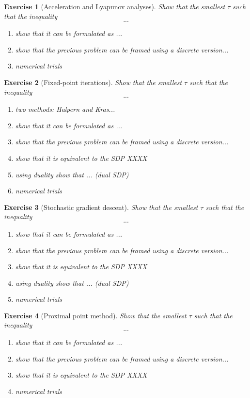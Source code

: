 \documentclass[11pt,a4paper]{article}
\newtheorem{exercise}{Exercise}
\begin{document}
	
	\begin{exercise}[Acceleration and Lyapunov analyses]
	Show that the smallest $\tau$ such that the inequality
	\[ ... \]
	\begin{enumerate}
	\item show that it can be formulated as ...
	\item show that the previous problem can be framed using a discrete version...
	\item numerical trials
	\end{enumerate}
	\end{exercise}
	
	\begin{exercise}[Fixed-point iterations]
	Show that the smallest $\tau$ such that the inequality
	\[ ... \]
	\begin{enumerate}
	\item two methods: Halpern and Kras...
	\item show that it can be formulated as ...
	\item show that the previous problem can be framed using a discrete version...
	\item show that it is equivalent to the SDP XXXX
	\item using duality show that ... (dual SDP)
	\item numerical trials
	\end{enumerate}
	\end{exercise}
	
	
	\begin{exercise}[Stochastic gradient descent]
	Show that the smallest $\tau$ such that the inequality
	\[ ... \]
	\begin{enumerate}
	\item show that it can be formulated as ...
	\item show that the previous problem can be framed using a discrete version...
	\item show that it is equivalent to the SDP XXXX
	\item using duality show that ... (dual SDP)
	\item numerical trials
	\end{enumerate}
	\end{exercise}
	
	
	\begin{exercise}[Proximal point method]
	Show that the smallest $\tau$ such that the inequality
	\[ ... \]
	\begin{enumerate}
	\item show that it can be formulated as ...
	\item show that the previous problem can be framed using a discrete version...
	\item show that it is equivalent to the SDP XXXX
	\item numerical trials
	\end{enumerate}
	\end{exercise}
	
\end{document}
